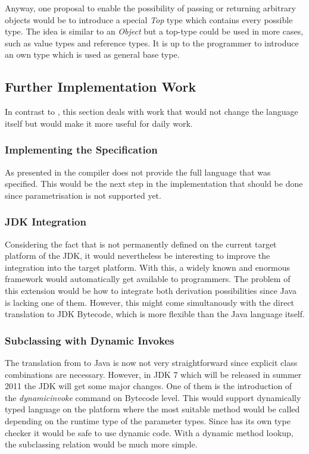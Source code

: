 Anyway, one proposal to enable the possibility of passing or returning
arbitrary objects would be to introduce a special \emph{Top} type which
contains every possible type. The idea is similar to an \emph{Object}
but a top-type could be used in more cases, such as value types and reference
types. It is up to the programmer to introduce an own type
which is used as general base type.

\subsection{Further Implementation Work}
In contrast to , this section deals with work that
would not change the language itself but would make it more useful
for daily work.

\subsubsection{Implementing the Specification}
As presented in  the compiler does not provide the
full language that was specified. This would be the next step in the
implementation that should be done since parametrisation is not supported
yet.

\subsubsection{JDK Integration}
Considering the fact that \ooplss is not permanently defined on the current
target platform of the JDK, it would nevertheless be interesting to
improve the integration into the target platform. With this, a widely
known and enormous framework would automatically get available to
\ooplss programmers. The problem of this extension would be how to integrate
both derivation possibilities since Java is lacking one of them. However,
this might come simultanously with the direct translation to JDK
Bytecode, which is more flexible than the Java language itself.

\subsubsection{Subclassing with Dynamic Invokes}
The translation from \ooplss to Java is now not very straightforward since
explicit class combinations are necessary. However, in JDK 7 which will
be released in summer 2011 the JDK will get some major changes. One
of them is the introduction of the \emph{dynamicinvoke} command on
Bytecode level. This would support dynamically typed language on the
platform where the most suitable method would be called depending on the
runtime type of the parameter types. Since \ooplss has its own type
checker it would be safe to use dynamic code. With a dynamic method
lookup, the subclassing relation would be much more simple.


